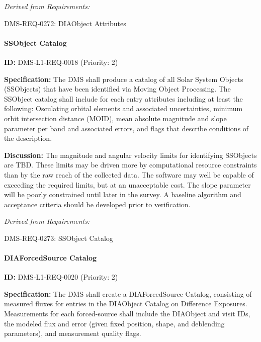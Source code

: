 \documentclass[SE,toc,lsstdraft]{lsstdoc}
\begin{document}
\emph{Derived from Requirements:}

DMS-REQ-0272:
DIAObject Attributes \newline

\paragraph{SSObject Catalog}\hfill  %

\label{DMS-L1-REQ-0018}
\textbf{ID:} DMS-L1-REQ-0018 (Priority: 2)

\textbf{Specification:} The DMS shall produce a catalog of all Solar System Objects (SSObjects) that have been identified via Moving Object Processing. The SSObject catalog shall include for each entry attributes including at least the following: Osculating orbital elements and associated uncertainties, minimum orbit intersection distance (MOID), mean absolute magnitude and slope parameter per band and associated errors, and flags that describe conditions of the description.

\textbf{Discussion: }The magnitude and angular velocity limits for identifying SSObjects are TBD. These limits may be driven more by computational resource constraints than by the raw reach of the collected data. The software may well be capable of exceeding the required limits, but at an unacceptable cost. The slope parameter will be poorly constrained until later in the survey. A baseline algorithm and acceptance criteria should be developed prior to verification.

\emph{Derived from Requirements:}

DMS-REQ-0273:
SSObject Catalog \newline

\paragraph{DIAForcedSource Catalog}\hfill  %

\label{DMS-L1-REQ-0020}
\textbf{ID:} DMS-L1-REQ-0020 (Priority: 2)

\textbf{Specification:} The DMS shall create a DIAForcedSource Catalog, consisting of measured fluxes for entries in the DIAObject Catalog on Difference Exposures. Measurements for each forced-source shall include the DIAObject and visit IDs, the modeled flux and error (given fixed position, shape, and deblending parameters), and measurement quality flags.
\end{document}

